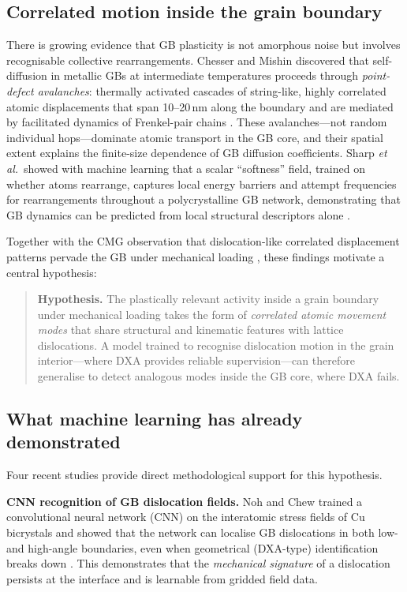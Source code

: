 \documentclass[11pt]{article}
\begin{document}
\subsection*{Correlated motion inside the grain boundary}
There is growing evidence that GB plasticity is not amorphous noise but involves recognisable collective rearrangements.
Chesser and Mishin discovered that self-diffusion in metallic GBs at intermediate temperatures proceeds through \emph{point-defect avalanches}: thermally activated cascades of string-like, highly correlated atomic displacements that span 10--20\,nm along the boundary and are mediated by facilitated dynamics of Frenkel-pair chains \cite{Chesser2022}.
These avalanches---not random individual hops---dominate atomic transport in the GB core, and their spatial extent explains the finite-size dependence of GB diffusion coefficients.
Sharp \emph{et al.}\ showed with machine learning that a scalar ``softness'' field, trained on whether atoms rearrange, captures local energy barriers and attempt frequencies for rearrangements throughout a polycrystalline GB network, demonstrating that GB dynamics can be predicted from local structural descriptors alone \cite{Sharp2018}.

Together with the CMG observation that dislocation-like correlated displacement patterns pervade the GB under mechanical loading \cite{Firman2024}, these findings motivate a central hypothesis:

\begin{quote}
\textbf{Hypothesis.} The plastically relevant activity inside a grain boundary under mechanical loading takes the form of \emph{correlated atomic movement modes} that share structural and kinematic features with lattice dislocations.
A model trained to recognise dislocation motion in the grain interior---where DXA provides reliable supervision---can therefore generalise to detect analogous modes inside the GB core, where DXA fails.
\end{quote}

\subsection*{What machine learning has already demonstrated}
Four recent studies provide direct methodological support for this hypothesis.

\textbf{CNN recognition of GB dislocation fields.} Noh and Chew trained a convolutional neural network (CNN) on the interatomic stress fields of Cu bicrystals and showed that the network can localise GB dislocations in both low- and high-angle boundaries, even when geometrical (DXA-type) identification breaks down \cite{Noh2024}.
This demonstrates that the \emph{mechanical signature} of a dislocation persists at the interface and is learnable from gridded field data.
\end{document}
